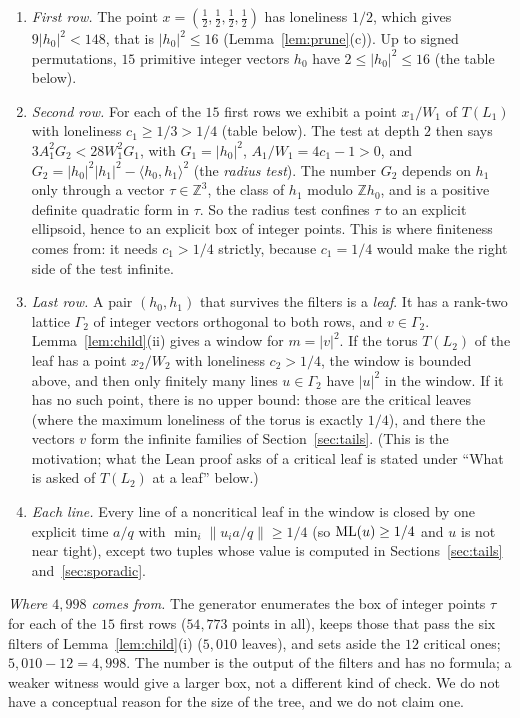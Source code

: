\documentclass[11pt]{article}
\theoremstyle{remark}
\newcommand{\Z}{\mathbb{Z}}
\newcommand{\dist}[1]{\lVert #1\rVert}
\begin{document}
\begin{enumerate}
\item \emph{First row.} The point $x=(\tfrac12,\tfrac12,\tfrac12,\tfrac12)$ has loneliness $1/2$, which gives $9|h_0|^2<148$, that is $|h_0|^2\le16$ (Lemma~\ref{lem:prune}(c)). Up to signed permutations, $15$ primitive integer vectors $h_0$ have $2\le|h_0|^2\le16$ (the table below).
\item \emph{Second row.} For each of the $15$ first rows we exhibit a point $x_1/W_1$ of $T(L_1)$ with loneliness $c_1\ge1/3>1/4$ (table below). The test at depth $2$ then says $3A_1^2G_2<28W_1^2G_1$, with $G_1=|h_0|^2$, $A_1/W_1=4c_1-1>0$, and $G_2=|h_0|^2|h_1|^2-\langle h_0,h_1\rangle^2$ (the \emph{radius test}). The number $G_2$ depends on $h_1$ only through a vector $\tau\in\Z^3$, the class of $h_1$ modulo $\Z h_0$, and is a positive definite quadratic form in $\tau$. So the radius test confines $\tau$ to an explicit ellipsoid, hence to an explicit box of integer points. This is where finiteness comes from: it needs $c_1>1/4$ strictly, because $c_1=1/4$ would make the right side of the test infinite.
\item \emph{Last row.} A pair $(h_0,h_1)$ that survives the filters is a \emph{leaf}. It has a rank-two lattice $\Gamma_2$ of integer vectors orthogonal to both rows, and $v\in \Gamma_2$. Lemma~\ref{lem:child}(ii) gives a window for $m=|v|^2$. If the torus $T(L_2)$ of the leaf has a point $x_2/W_2$ with loneliness $c_2>1/4$, the window is bounded above, and then only finitely many lines $u\in \Gamma_2$ have $|u|^2$ in the window. If it has no such point, there is no upper bound: those are the critical leaves (where the maximum loneliness of the torus is exactly $1/4$), and there the vectors $v$ form the infinite families of Section~\ref{sec:tails}. (This is the motivation; what the Lean proof asks of a critical leaf is stated under ``What is asked of $T(L_2)$ at a leaf'' below.)
\item \emph{Each line.} Every line of a noncritical leaf in the window is closed by one explicit time $a/q$ with $\min_i\dist{u_ia/q}\ge1/4$ (so $\mathrm{ML}(u)\ge1/4$ and $u$ is not near tight), except two tuples whose value is computed in Sections~\ref{sec:tails} and~\ref{sec:sporadic}.
\end{enumerate}
\emph{Where $4{,}998$ comes from.} The generator enumerates the box of integer points $\tau$ for each of the $15$ first rows ($54{,}773$ points in all), keeps those that pass the six filters of Lemma~\ref{lem:child}(i) ($5{,}010$ leaves), and sets aside the $12$ critical ones; $5{,}010-12=4{,}998$. The number is the output of the filters and has no formula; a weaker witness would give a larger box, not a different kind of check. We do not have a conceptual reason for the size of the tree, and we do not claim one.
\end{document}
